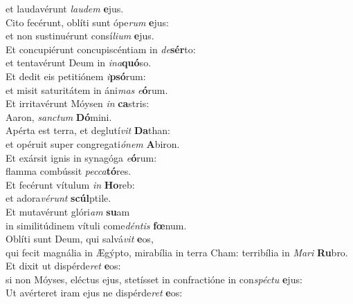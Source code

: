 \oddverse et laudavérunt \textit{lau}\textit{dem} \textbf{e}jus.\\
\evenverse Cito fecérunt, oblíti sunt ópe\textit{rum} \textbf{e}jus:~\*\\
\evenverse et non sustinuérunt consí\textit{li}\textit{um} \textbf{e}jus.\\
\oddverse Et concupiérunt concupiscéntiam in \textit{de}\textbf{sér}to:~\*\\
\oddverse et tentavérunt Deum in \textit{i}\textit{na}\textbf{quó}so.\\
\evenverse Et dedit eis petitiónem \textit{i}\textbf{psó}rum:~\*\\
\evenverse et misit saturitátem in áni\textit{mas} \textit{e}\textbf{ó}rum.\\
\oddverse Et irritavérunt Móysen \textit{in} \textbf{ca}stris:~\*\\
\oddverse Aaron, \textit{san}\textit{ctum} \textbf{Dó}mini.\\
\evenverse Apérta est terra, et deglutí\textit{vit} \textbf{Da}than:~\*\\
\evenverse et opéruit super congregati\textit{ó}\textit{nem} \textbf{A}biron.\\
\oddverse Et exársit ignis in synagóga \textit{e}\textbf{ó}rum:~\*\\
\oddverse flamma combússit \textit{pec}\textit{ca}\textbf{tó}res.\\
\evenverse Et fecérunt vítulum \textit{in} \textbf{Ho}reb:~\*\\
\evenverse et adora\textit{vé}\textit{runt} \textbf{scúl}ptile.\\
\oddverse Et mutavérunt glóri\textit{am} \textbf{su}am~\*\\
\oddverse in similitúdinem vítuli come\textit{dén}\textit{tis} \textbf{fœ}num.\\
\evenverse Oblíti sunt Deum, qui salvá\textit{vit} \textbf{e}os,~\*\\
\evenverse qui fecit magnália in Ægýpto, mirabília in terra Cham: terribília in \textit{Ma}\textit{ri} \textbf{Ru}bro.\\
\oddverse Et dixit ut dispérde\textit{ret} \textbf{e}os:~\*\\
\oddverse si non Móyses, eléctus ejus, stetísset in confractióne in con\textit{spé}\textit{ctu} \textbf{e}jus:\\
\evenverse Ut avérteret iram ejus ne dispérde\textit{ret} \textbf{e}os:~\*\\

